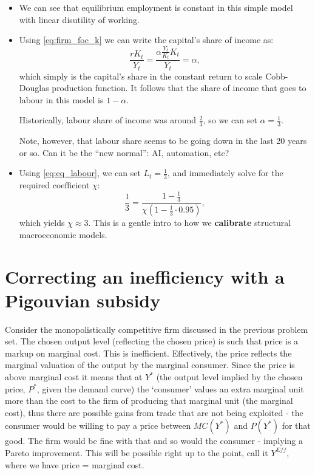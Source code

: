 \documentclass[authoryear,11pt]{elsarticle}
\begin{document}
\begin{itemize}
	\item We can see that equilibrium employment is constant in this simple model with linear disutility of working.
	
	\item Using \eqref{eq:firm_foc_k} we can write the capital's share of income as:
	\[
		\frac{rK_t}{Y_t} = \frac{\alpha \frac{Y_t}{K_t}K_t}{Y_t} = \alpha,
	\]
	which simply is the capital's share in the constant return to scale Cobb-Douglas production function. It follows that the share of income that goes to labour in this model is $1-\alpha$. 
		
	Historically, labour share of income was around $\frac{2}{3}$, so we can set $\alpha=\frac{1}{3}$. 
	
	Note, however, that labour share seems to be going down in the last 20 years or so. Can it be the ``new normal'': AI, automation, etc? 
	
	\item Using \eqref{eq:eq_labour}, we can set $L_t=\frac{1}{3}$, and immediately solve for the required coefficient $\chi$:
	\[
		\frac{1}{3} = \frac{1-\frac{1}{3}}{\chi\left(1-\frac{1}{3}\cdot 0.95\right)},
	\]
	which yields $\chi \approx 3$. This is a gentle intro to how we \textbf{calibrate} structural macroeconomic models.

\end{itemize}


\section{Correcting an inefficiency with a Pigouvian subsidy}
Consider the monopolistically competitive firm discussed in the previous problem set. The chosen output level (reflecting the chosen price) is such that price is a markup on marginal cost. This is inefficient. Effectively, the price reflects the marginal valuation of the output by the marginal consumer. Since the price is above marginal cost it means that at $Y^{\ast}$ (the output level implied by the chosen price, $P^{\ast}$, given the demand curve) the `consumer' values an extra marginal unit more than the cost to the firm of producing that marginal unit (the marginal cost), thus there are possible gains from trade that are not being exploited - the consumer would be willing to pay a price between $MC(Y^{\ast})$ and $P(Y^{\ast})$ for that good. The firm would be fine with that and so would the consumer - implying a Pareto improvement. This will be possible right up to the point, call it $Y^{Eff}$, where we have price = marginal cost.
\end{document}
